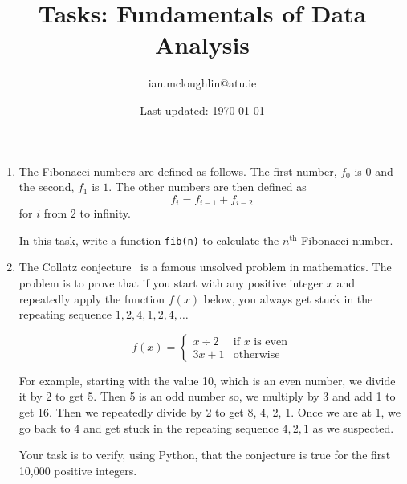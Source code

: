 \documentclass{iansnotes}
\title{Tasks: Fundamentals of Data Analysis}
\author{ian.mcloughlin@atu.ie}
\date{Last updated: \today}
\begin{document}
 
\maketitle
 
\begin{enumerate}
  
  \item The Fibonacci numbers are defined as follows. The first number, $f_0$ is 0 and the second, $f_1$ is $1$. The other numbers are then defined as
  $$f_i = f_{i-1} + f_{i-2}$$
  for $i$ from $2$ to infinity.
  
  In this task, write a function \texttt{fib(n)} to calculate the $n^{\textrm{th}}$ Fibonacci number.

  \item The Collatz conjecture~\autocite{quantacollatz} is a famous unsolved problem in mathematics. The problem is to prove that if you start with any positive integer $x$ and repeatedly apply the function $f(x)$ below, you always get stuck in the repeating sequence $1,2,4,1,2,4,\ldots$ 
  
  $$ f(x) = \begin{cases}
    x \div 2 & \text{if } x \text{ is even} \\
    3x + 1              & \text{otherwise} 
  \end{cases}$$

  For example, starting with the value 10, which is an even number, we divide it by 2 to get 5.
  Then 5 is an odd number so, we multiply by 3 and add 1 to get 16.
  Then we repeatedly divide by 2 to get 8, 4, 2, 1.
  Once we are at 1, we go back to 4 and get stuck in the repeating sequence $4, 2, 1$ as we suspected.

  Your task is to verify, using Python, that the conjecture is true for the first 10,000 positive integers.
  
\end{enumerate}
\end{document}
